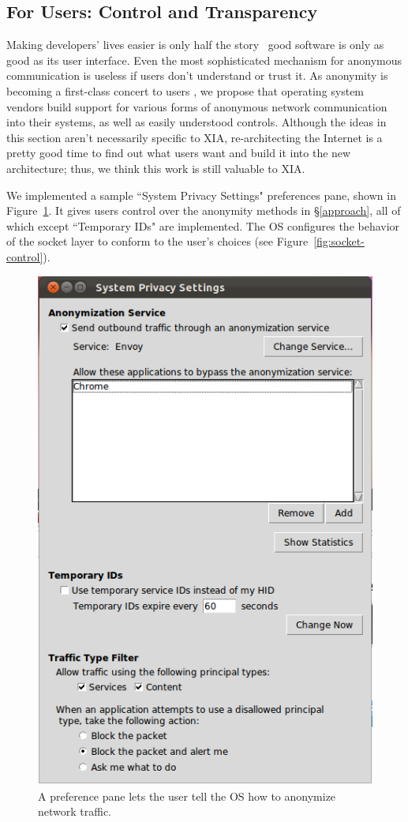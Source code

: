 \documentclass{article}
\begin{document}
\subsection{For Users: Control and Transparency}
\label{control}
Making developers' lives easier is only half the story \textemdash~good software is only as good as its user interface. Even the most sophisticated mechanism for anonymous communication is useless if users don't understand or trust it. As anonymity is becoming a first-class concert to users \cite{user-study}, we propose that operating system vendors build support for various forms of anonymous network communication into their systems, as well as easily understood controls. Although the ideas in this section aren't necessarily specific to XIA, re-architecting the Internet is a pretty good time to find out what users want and build it into the new architecture; thus, we think this work is still valuable to XIA.

We implemented a sample ``System Privacy Settings" preferences pane, shown in Figure~\ref{fig:settings}. It gives users control over the anonymity methods in \S\ref{approach}, all of which except ``Temporary IDs" are implemented. The OS configures the behavior of the socket layer to conform to the user's choices (see Figure~\ref{fig:socket-control}).

\begin{figure}
\centering
\includegraphics[scale=0.75]{images/privacy-settings.png}
\caption{A preference pane lets the user tell the OS how to anonymize network traffic.}
\label{fig:settings}
\end{figure}
\end{document}
